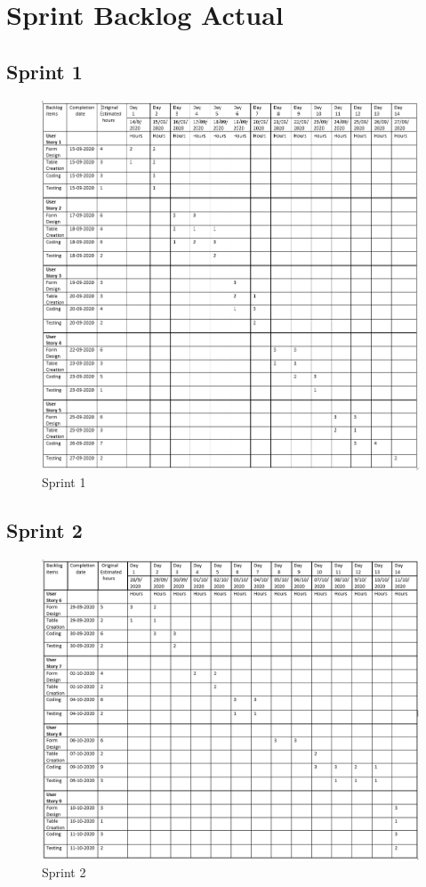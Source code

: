 \documentclass[a4paper,12pt]{report}
\begin{document}
\section{Sprint Backlog Actual}
\subsection {Sprint 1}
\begin{figure}[bph]
	\centering
	\includegraphics[width=0.9\linewidth]{img/sprint/sp1actual}
	\caption{Sprint 1}
\end{figure}
\pagebreak
\subsection {Sprint 2}
\begin{figure}[bph]
	\centering
	\includegraphics[width=0.9\linewidth]{img/sprint/SPRINT2ACTUAL}
	\caption{Sprint 2}
\end{figure}
\pagebreak
\end{document}
